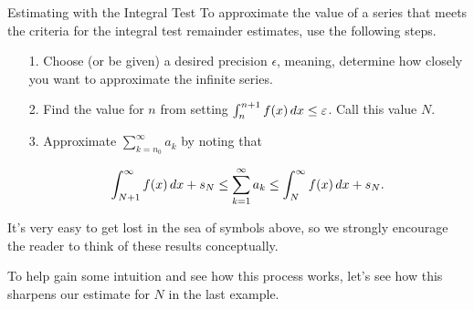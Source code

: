 \documentclass{ximera}
\begin{document}
\begin{procedure}{Estimating with the Integral Test}
To approximate the value of a series that meets the criteria for the integral test remainder estimates, use the following steps.

\begin{itemize}
\item[1.] Choose (or be given) a desired precision $\epsilon$, meaning, determine how closely you want to approximate the infinite series.
\item[2.] Find the value for $n$ from setting $\int_n^{n+1} f(x) \mathop{}\!d x \leq \varepsilon$.  Call this value $N$.
\item[3.] Approximate $\sum_{k=n_0}^{\infty} a_k$ by noting that 

\[
\int_{N+1}^\infty f(x) \mathop{}\!d x  +s_N \leq \sum_{k=1}^{\infty} a_k \leq \int_{N}^\infty f(x) \mathop{}\!d x  +s_N.
\]
\end{itemize}

\end{procedure}



\begin{warning}
It's very easy to get lost in the sea of symbols above, so we strongly encourage the reader to think of these results conceptually.  
\end{warning}

To help gain some intuition and see how this process works, let's see how this sharpens our estimate for $N$ in the last example.
\end{document}

